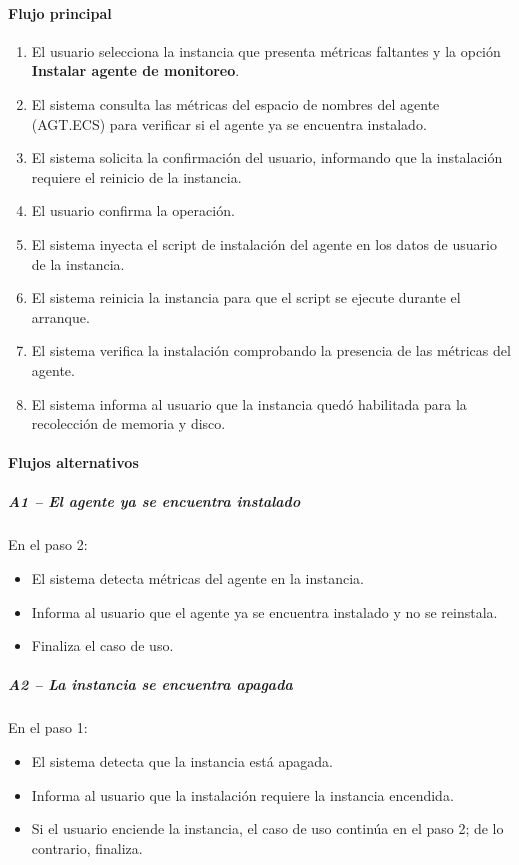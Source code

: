 \paragraph*{Flujo principal}

\begin{enumerate}
\item El usuario selecciona la instancia que presenta métricas faltantes y la opción \textbf{Instalar agente de monitoreo}.
\item El sistema consulta las métricas del espacio de nombres del agente (AGT.ECS) para verificar si el agente ya se encuentra instalado.
\item El sistema solicita la confirmación del usuario, informando que la instalación requiere el reinicio de la instancia.
\item El usuario confirma la operación.
\item El sistema inyecta el script de instalación del agente en los datos de usuario de la instancia.
\item El sistema reinicia la instancia para que el script se ejecute durante el arranque.
\item El sistema verifica la instalación comprobando la presencia de las métricas del agente.
\item El sistema informa al usuario que la instancia quedó habilitada para la recolección de memoria y disco.
\end{enumerate}

\paragraph*{Flujos alternativos}

\subparagraph{A1 -- El agente ya se encuentra instalado}

En el paso 2:

\begin{itemize}
\item El sistema detecta métricas del agente en la instancia.
\item Informa al usuario que el agente ya se encuentra instalado y no se reinstala.
\item Finaliza el caso de uso.
\end{itemize}

\subparagraph{A2 -- La instancia se encuentra apagada}

En el paso 1:

\begin{itemize}
\item El sistema detecta que la instancia está apagada.
\item Informa al usuario que la instalación requiere la instancia encendida.
\item Si el usuario enciende la instancia, el caso de uso continúa en el paso 2; de lo contrario, finaliza.
\end{itemize}

